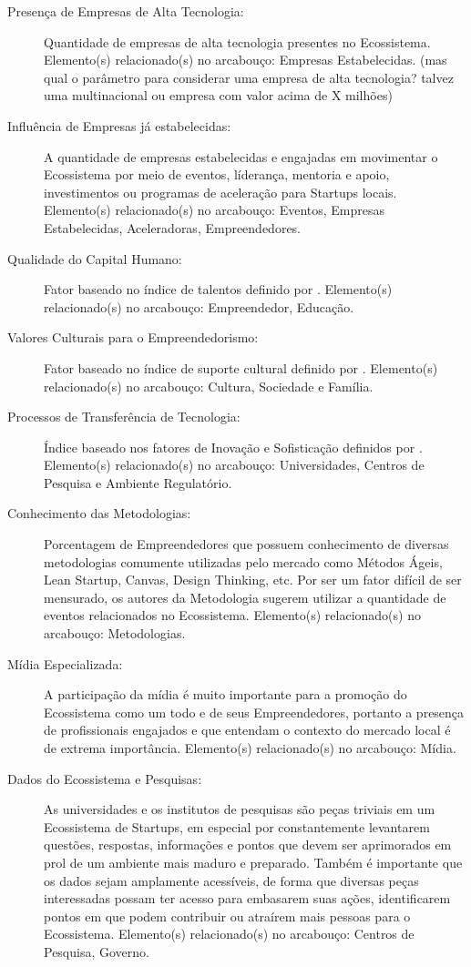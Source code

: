 \begin{description}
  \item [Presença de Empresas de Alta Tecnologia:] Quantidade de empresas de alta tecnologia presentes no Ecossistema. Elemento(s) relacionado(s) no arcabouço: Empresas Estabelecidas. (mas qual o parâmetro para considerar uma empresa de alta tecnologia? talvez uma multinacional ou empresa com valor acima de X milhões)

  \item [Influência de Empresas já estabelecidas:] A quantidade de empresas estabelecidas e engajadas em movimentar o Ecossistema por meio de eventos, líderança, mentoria e apoio, investimentos ou programas de aceleração para Startups locais. Elemento(s) relacionado(s) no arcabouço: Eventos, Empresas Estabelecidas, Aceleradoras, Empreendedores.

  \item [Qualidade do Capital Humano:] Fator baseado no índice de talentos definido por . Elemento(s) relacionado(s) no arcabouço: Empreendedor, Educação.

  \item [Valores Culturais para o Empreendedorismo:] Fator baseado no índice de suporte cultural definido por . Elemento(s) relacionado(s) no arcabouço: Cultura, Sociedade e Família.

  \item [Processos de Transferência de Tecnologia:] Índice baseado nos fatores de Inovação e Sofisticação definidos por . Elemento(s) relacionado(s) no arcabouço: Universidades, Centros de Pesquisa e Ambiente Regulatório.

  \item [Conhecimento das Metodologias:] Porcentagem de Empreendedores que possuem conhecimento de diversas metodologias comumente utilizadas pelo mercado como Métodos Ágeis, Lean Startup, Canvas, Design Thinking, etc. Por ser um fator difícil de ser mensurado, os autores da Metodologia sugerem utilizar a quantidade de eventos relacionados no Ecossistema. Elemento(s) relacionado(s) no arcabouço: Metodologias.

  \item [Mídia Especializada:] A participação da mídia é muito importante para a promoção do Ecossistema como um todo e de seus Empreendedores, portanto a presença de profissionais engajados e que entendam o contexto do mercado local é de extrema importância. Elemento(s) relacionado(s) no arcabouço: Mídia.

  \item [Dados do Ecossistema e Pesquisas:] As universidades e os institutos de pesquisas são peças triviais em um Ecossistema de Startups, em especial por constantemente levantarem questões, respostas, informações e pontos que devem ser aprimorados em prol de um ambiente mais maduro e preparado. Também é importante que os dados sejam amplamente acessíveis, de forma que diversas peças interessadas possam ter acesso para embasarem suas ações, identificarem pontos em que podem contribuir ou atraírem mais pessoas para o Ecossistema. Elemento(s) relacionado(s) no arcabouço: Centros de Pesquisa, Governo.
  

\end{description}
